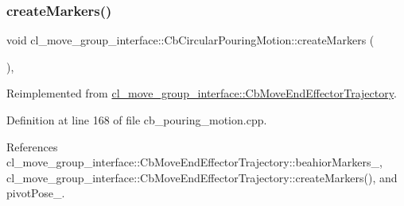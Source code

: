 \subsubsection{\texorpdfstring{create\+Markers()}{createMarkers()}}
{\footnotesize\ttfamily void cl\+\_\+move\+\_\+group\+\_\+interface\+::\+Cb\+Circular\+Pouring\+Motion\+::create\+Markers (\begin{DoxyParamCaption}{ }\end{DoxyParamCaption})\hspace{0.3cm}{\ttfamily [override]}, {\ttfamily [virtual]}}



Reimplemented from \hyperlink{classcl__move__group__interface_1_1CbMoveEndEffectorTrajectory_a442efa1d5bc9e9a16f74ecd31b13d9b5}{cl\+\_\+move\+\_\+group\+\_\+interface\+::\+Cb\+Move\+End\+Effector\+Trajectory}.



Definition at line 168 of file cb\+\_\+pouring\+\_\+motion.\+cpp.



References cl\+\_\+move\+\_\+group\+\_\+interface\+::\+Cb\+Move\+End\+Effector\+Trajectory\+::beahior\+Markers\+\_\+, cl\+\_\+move\+\_\+group\+\_\+interface\+::\+Cb\+Move\+End\+Effector\+Trajectory\+::create\+Markers(), and pivot\+Pose\+\_\+.


